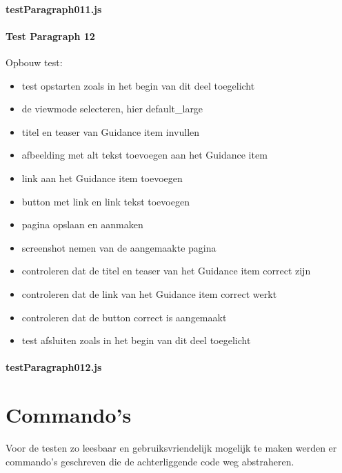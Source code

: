 \paragraph{testParagraph011.js}


\clearpage
\paragraph{Test Paragraph 12}
\label{test12}
Opbouw test: 
\begin{itemize}
\item test opstarten zoals in het begin van dit deel toegelicht
\item de viewmode selecteren, hier default\_large
\item titel en teaser van Guidance item invullen
\item afbeelding met alt tekst toevoegen aan het Guidance item
\item link aan het Guidance item toevoegen
\item button met link en link tekst toevoegen
\item pagina opslaan en aanmaken
\item screenshot nemen van de aangemaakte pagina
\item controleren dat de titel en teaser van het Guidance item correct zijn
\item controleren dat de link van het Guidance item correct werkt
\item controleren dat de button correct is aangemaakt
\item test afsluiten zoals in het begin van dit deel toegelicht
\end{itemize}
\paragraph{testParagraph012.js}


\clearpage
\section{Commando's}
Voor de testen zo leesbaar en gebruiksvriendelijk mogelijk te maken werden er commando's geschreven die de achterliggende code weg abstraheren.

